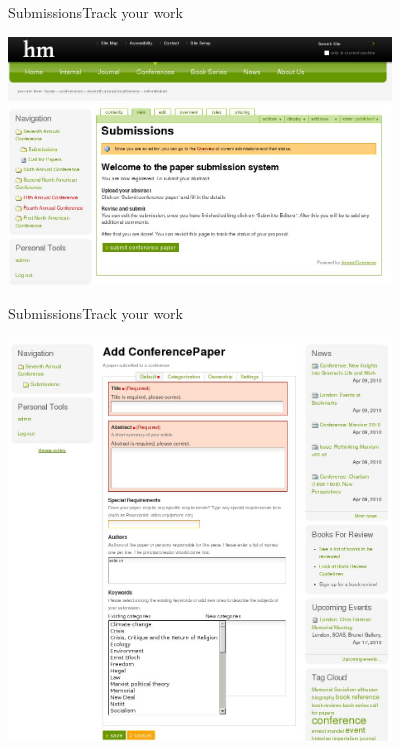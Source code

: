 \begin{frame}{Submissions}{Track your work}

\begin{center}
\includegraphics[width=4in]{1-conference-submissions-homepage.jpg}
\end{center}
  
\end{frame} 

\begin{frame}{Submissions}{Track your work}
\begin{center}
\includegraphics[width=4in]{2-conference-SubmitConferencePaper-form.jpg}
\end{center}
\end{frame} 

